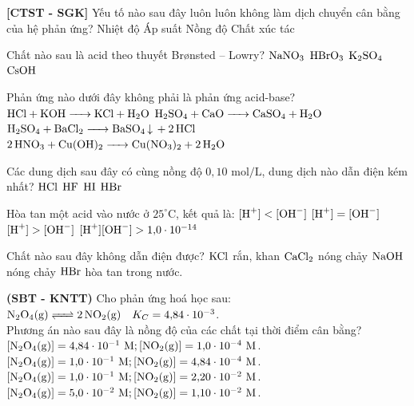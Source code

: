 \documentclass[12pt,a4paper]{article}
\begin{document}
\begin{ex}
\textbf{[CTST - SGK]} Yếu tố nào sau đây luôn luôn không làm dịch chuyển cân bằng của hệ phản ứng?
\choice
{Nhiệt độ}
{Áp suất}
{Nồng độ}
{Chất xúc tác}
\loigiai{}
\end{ex}

\begin{ex}
Chất nào sau là acid theo thuyết Brønsted -- Lowry?
\choice
{$\ce{NaNO3}$}
{$\ce{HBrO3}$}
{$\ce{K2SO4}$}
{$\ce{CsOH}$}
\loigiai{}
\end{ex}

\begin{ex}
Phản ứng nào dưới đây không phải là phản ứng acid-base?
\choice
{$\ce{HCl + KOH -> KCl + H2O}$}
{$\ce{H2SO4 + CaO -> CaSO4 + H2O}$}
{$\ce{H2SO4 + BaCl2 -> BaSO4 v + 2HCl}$}
{$\ce{2HNO3 + Cu(OH)2 -> Cu(NO3)2 + 2H2O}$}
\loigiai{}
\end{ex}

\begin{ex}
Các dung dịch sau đây có cùng nồng độ $0{,}10\text{ mol/L}$, dung dịch nào dẫn điện kém nhất?
\choice
{$\ce{HCl}$}
{$\ce{HF}$}
{$\ce{HI}$}
{$\ce{HBr}$}
\loigiai{}
\end{ex}

\begin{ex}
Hòa tan một acid vào nước ở $25^\circ\text{C}$, kết quả là:
\choice
{$[\ce{H+}] < [\ce{OH-}]$}
{$[\ce{H+}] = [\ce{OH-}]$}
{$[\ce{H+}] > [\ce{OH-}]$}
{$[\ce{H+}][\ce{OH-}] > 1{,}0 \cdot 10^{-14}$}
\loigiai{}
\end{ex}

\begin{ex}
Chất nào sau đây không dẫn điện được?
\choice
{$\ce{KCl}$ rắn, khan}
{$\ce{CaCl2}$ nóng chảy}
{$\ce{NaOH}$ nóng chảy}
{$\ce{HBr}$ hòa tan trong nước.}
\loigiai{}
\end{ex}

\begin{ex}
\textbf{(SBT - KNTT)} Cho phản ứng hoá học sau: $\ce{N2O4(g) <=> 2NO2(g)} \quad K_C = 4{,}84 \cdot 10^{-3}$.\\
Phương án nào sau đây là nồng độ của các chất tại thời điểm cân bằng?
\choice
{$[\ce{N2O4(g)}] = 4{,}84 \cdot 10^{-1}\text{ M}; [\ce{NO2(g)}] = 1{,}0 \cdot 10^{-4}\text{ M}$.}
{$[\ce{N2O4(g)}] = 1{,}0 \cdot 10^{-1}\text{ M}; [\ce{NO2(g)}] = 4{,}84 \cdot 10^{-4}\text{ M}$.}
{$[\ce{N2O4(g)}] = 1{,}0 \cdot 10^{-1}\text{ M}; [\ce{NO2(g)}] = 2{,}20 \cdot 10^{-2}\text{ M}$.}
{$[\ce{N2O4(g)}] = 5{,}0 \cdot 10^{-2}\text{ M}; [\ce{NO2(g)}] = 1{,}10 \cdot 10^{-2}\text{ M}$.}
\loigiai{}
\end{ex}
\end{document}
